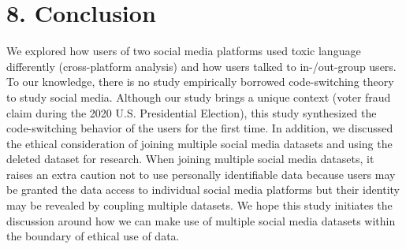 \documentclass[Crown,sagev,times]{sagej}
\begin{document}
\section{8. Conclusion}

We explored how users of two social media platforms used toxic language differently (cross-platform analysis) 
and how users talked to in-/out-group users. To our knowledge, there is no study empirically borrowed code-switching theory to study social media. Although our study brings a unique context (voter fraud claim during the 2020 U.S. Presidential Election), this study synthesized the code-switching behavior of the users for the first time. In addition, we discussed the ethical consideration of joining multiple social media datasets and using the deleted dataset for research. When joining multiple social media datasets, it raises an extra caution not to use personally identifiable data because users may be granted the data access to individual social media platforms but their identity may be revealed by coupling multiple datasets. We hope this study initiates the discussion around how we can make use of multiple social media datasets within the boundary of ethical use of data.


\end{document}
